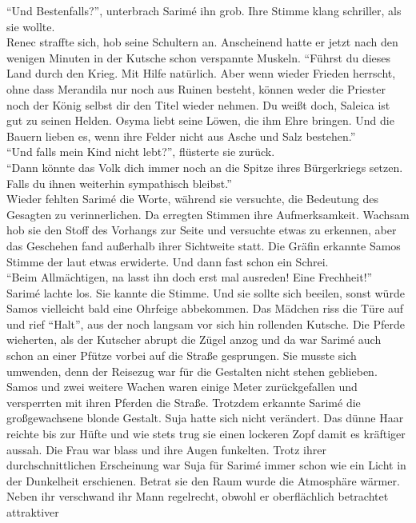 ``Und Bestenfalls?'', unterbrach Sarimé ihn grob. Ihre Stimme klang schriller, als sie wollte.\\
Renec straffte sich, hob seine Schultern an. Anscheinend hatte er jetzt nach den wenigen Minuten in 
der Kutsche schon verspannte Muskeln. ``Führst du dieses Land durch den Krieg. Mit Hilfe natürlich. 
Aber wenn wieder Frieden herrscht, ohne dass Merandila nur noch aus Ruinen besteht, können weder die 
Priester noch der König selbst dir den Titel wieder nehmen. Du weißt doch, Saleica ist gut zu seinen 
Helden. Osyma liebt seine Löwen, die ihm Ehre bringen. Und die Bauern lieben es, wenn ihre Felder 
nicht aus Asche und Salz bestehen.''\\
``Und falls mein Kind nicht lebt?'', flüsterte sie zurück.\\
``Dann könnte das Volk dich immer noch an die Spitze ihres Bürgerkriegs setzen. Falls du ihnen 
weiterhin sympathisch bleibst.''\\
Wieder fehlten Sarimé die Worte, während sie versuchte, die Bedeutung des Gesagten zu 
verinnerlichen. Da erregten Stimmen ihre Aufmerksamkeit. Wachsam hob sie den Stoff des Vorhangs zur 
Seite und versuchte etwas zu erkennen, aber das Geschehen fand außerhalb ihrer Sichtweite statt. 
Die Gräfin erkannte Samos Stimme der laut etwas erwiderte. Und dann fast schon ein Schrei.\\
``Beim Allmächtigen, na lasst ihn doch erst mal ausreden! Eine Frechheit!''\\
Sarimé lachte los. Sie kannte die Stimme. Und sie sollte sich beeilen, sonst würde Samos vielleicht 
bald eine Ohrfeige abbekommen. Das Mädchen riss die Türe auf und rief ``Halt'', aus der noch 
langsam vor sich hin rollenden Kutsche. Die Pferde wieherten, als der Kutscher abrupt die Zügel 
anzog und da war Sarimé auch schon an einer Pfütze vorbei auf die Straße gesprungen. Sie musste sich 
umwenden, denn der Reisezug war für die Gestalten nicht stehen geblieben. Samos und zwei weitere 
Wachen waren einige Meter zurückgefallen und versperrten mit ihren Pferden die Straße. Trotzdem 
erkannte Sarimé die großgewachsene blonde Gestalt. Suja hatte sich nicht verändert. Das dünne Haar 
reichte bis zur Hüfte und wie stets trug sie einen lockeren Zopf damit es kräftiger aussah. Die Frau 
war blass und ihre Augen funkelten. Trotz ihrer durchschnittlichen Erscheinung war Suja für Sarimé 
immer schon wie ein Licht in der Dunkelheit erschienen. Betrat sie den Raum wurde die Atmosphäre 
wärmer. Neben ihr verschwand ihr Mann regelrecht, obwohl er oberflächlich betrachtet attraktiver 
